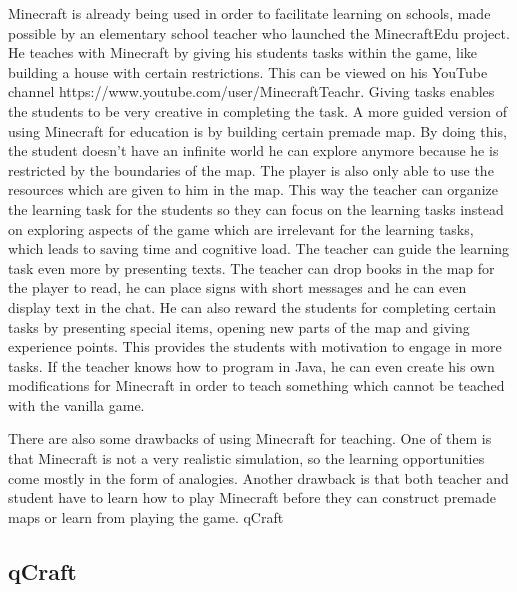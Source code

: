 \documentclass[12pt]{report} %
\begin{document}
Minecraft is already being used in order to facilitate learning on schools, made possible by an elementary school teacher who launched the MinecraftEdu project. He teaches with Minecraft by giving his students tasks within the game, like building a house with  certain restrictions. This can be viewed on his YouTube channel https://www.youtube.com/user/MinecraftTeachr. Giving tasks enables the students to be very creative in completing the task. A more guided version of using Minecraft for education is by building certain premade map. By doing this, the student doesn't have an infinite world he can explore anymore because he is restricted by the boundaries of the map. The player is also only able to use the resources which are given to him in the map. This way the teacher can organize the learning task for the students so they can focus on the learning tasks instead on exploring aspects of the game which are irrelevant  for the learning tasks, which leads to saving time and cognitive load. The teacher can guide the learning task even more by presenting texts. The teacher can drop books in the map for the player to read, he can place signs with short messages and he can even display text in the chat. He can also reward the students for completing certain tasks by presenting special items, opening new parts of the map and giving experience points. This provides the students with motivation to engage in more tasks. If the teacher knows how to program in Java, he can even create his own modifications for Minecraft in order to teach something which cannot be teached with the vanilla game.

There are also some drawbacks of using Minecraft for teaching. One of them is that Minecraft is not a very realistic simulation, so the learning opportunities come mostly in the form of analogies. Another drawback is that both teacher and student have to learn how to play Minecraft before they can construct premade maps or learn from playing the game.
qCraft

\subsection{qCraft}
\end{document}

